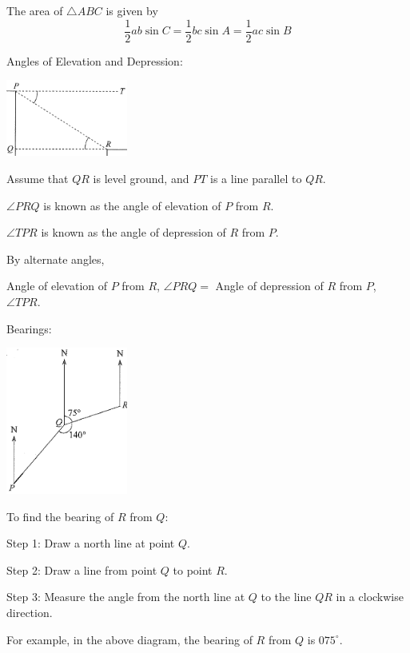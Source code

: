 \documentclass[twocolumn]{article}
\begin{document}
\noindent 
The area of $\triangle A B C$ is given by
$$
\frac{1}{2} a b \sin C=\frac{1}{2} b c \sin A=\frac{1}{2} a c \sin B
$$

\bigskip

\noindent 
Angles of Elevation and Depression:

\includegraphics[width=0.3\textwidth]{105.png}

\bigskip

\noindent 
Assume that $QR$ is level ground, and $PT$ is a line parallel to $QR$.

\noindent
$\angle P R Q$ is known as the angle of elevation of $P$ from $R$.

\noindent
$\angle T P R$ is known as the angle of depression of $R$ from $P$.

\noindent
By alternate angles,

\noindent
Angle of elevation of $P$ from $R$, $\angle P R Q=$ Angle of depression of $R$ from $P$, $\angle T P R$.

\bigskip

\noindent 
Bearings:

\includegraphics[width=0.3\textwidth]{107.png}

\bigskip

\noindent 
To find the bearing of $R$ from $Q$:

\noindent 
Step 1: Draw a north line at point $Q$.

\noindent 
Step 2: Draw a line from point $Q$ to point $R$.

\noindent
Step 3: Measure the angle from the north line at $Q$ to the line $QR$ in a clockwise direction.

\bigskip

\noindent 
For example, in the above diagram, the bearing of $R$ from $Q$ is $075^\circ$.
\end{document}
